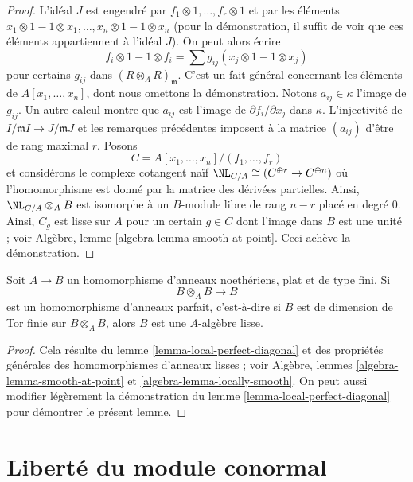 \begin{proof}
\medskip\noindent
L'idéal $J$ est engendré par $f_1 \otimes 1, \ldots, f_r \otimes 1$
et par les éléments $x_1 \otimes 1 - 1 \otimes x_1, \ldots,
x_n \otimes 1 - 1 \otimes x_n$ (pour la démonstration, il suffit de
voir que ces éléments appartiennent à l'idéal $J$).
On peut alors écrire
$$
f_i \otimes 1 - 1 \otimes f_i =
\sum g_{ij} (x_j \otimes 1 - 1 \otimes x_j)
$$
pour certains $g_{ij}$ dans $(R \otimes_A R)_\mathfrak m$. C'est un fait général
concernant les éléments de $A[x_1, \ldots, x_n]$, dont nous omettons la démonstration.
Notons $a_{ij} \in \kappa$ l'image de $g_{ij}$. Un autre calcul
montre que $a_{ij}$ est l'image de $\partial f_i / \partial x_j$ dans $\kappa$.
L'injectivité de $I/\mathfrak m I \to J/\mathfrak m J$ et les remarques
précédentes imposent à la matrice $(a_{ij})$ d'être de rang maximal $r$.
Posons
$$
C = A[x_1, \ldots, x_n]/(f_1, \ldots, f_r)
$$
et considérons le complexe cotangent naïf
$\NL_{C/A} \cong (C^{\oplus r} \to C^{\oplus n})$
où l'homomorphisme est donné par la matrice des dérivées partielles.
Ainsi, $\NL_{C/A} \otimes_A B$
est isomorphe à un $B$-module libre de rang $n - r$ placé en degré $0$.
Ainsi, $C_g$ est lisse sur $A$ pour un certain $g \in C$ dont l'image dans $B$ est une unité ; voir Algèbre, lemme \ref{algebra-lemma-smooth-at-point}.
Ceci achève la démonstration.
\end{proof}

\begin{lemma}
\label{lemma-perfect-diagonal}
Soit $A \to B$ un homomorphisme d'anneaux noethériens, plat et de type fini. Si
$$
B \otimes_A B \longrightarrow B
$$
est un homomorphisme d'anneaux parfait, c'est-à-dire si $B$ est de dimension de Tor finie sur
$B \otimes_A B$, alors $B$ est une $A$-algèbre lisse.
\end{lemma}

\begin{proof}
Cela résulte du lemme \ref{lemma-local-perfect-diagonal}
et des propriétés générales des homomorphismes d'anneaux lisses ; voir
Algèbre, lemmes \ref{algebra-lemma-smooth-at-point} et
\ref{algebra-lemma-locally-smooth}.
On peut aussi modifier légèrement la démonstration du
lemme \ref{lemma-local-perfect-diagonal} pour démontrer
le présent lemme.
\end{proof}






\section{Liberté du module conormal}
\label{section-freeness-conormal}


